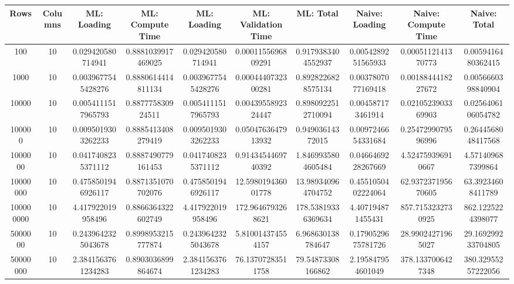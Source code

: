 \begin{table}[htb]
    \centering
    \begin{tabular}{@{}cccccccccc@{}}
        \toprule
        Rows & Columns & ML: Loading & ML: Compute Time & ML: Loading & ML: Validation Time & ML: Total & Naive: Loading & Naive: Compute Time & Naive: Total \\
        \midrule
        100 & 10 & 0.029420580714941 & 0.8881039917469025 & 0.029420580714941 & 0.0001155696809291 & 0.9179383404552937 & 0.0054289251565933 & 0.0005112141370773 & 0.0059416480362415 \\
        1000 & 10 & 0.0039677545428276 & 0.8880614414811134 & 0.0039677545428276 & 0.0004440732300281 & 0.8928226828575134 & 0.0037807077169418 & 0.0018844418227672 & 0.0056660398840904 \\
        10000 & 10 & 0.0054111517965793 & 0.887775830924511 & 0.0054111517965793 & 0.0043955892324447 & 0.8980922512710094 & 0.004587173461914 & 0.0210523903369903 & 0.0256406106054782 \\
        100000 & 10 & 0.0095019303262233 & 0.8885413408279419 & 0.0095019303262233 & 0.0504763647913932 & 0.94903614372015 & 0.0097246654331684 & 0.2547299079596996 & 0.2644568048417568 \\
        1000000 & 10 & 0.0417408235371112 & 0.8887490779161453 & 0.0417408235371112 & 0.9143454469740392 & 1.8469935804605484 & 0.0466469228267669 & 4.524759396910667 & 4.571409687399864 \\
        10000000 & 10 & 0.4758501946926117 & 0.8871351070702076 & 0.4758501946926117 & 12.598019436001778 & 13.989340964704752 & 0.4551050402224064 & 62.937237195670605 & 63.39234608411789 \\
        100000000 & 10 & 4.417922019958496 & 0.8866364322602749 & 4.417922019958496 & 172.9646793268621 & 178.53819336369634 & 4.407194871455431 & 857.7153232730925 & 862.1225224398077 \\
        5000000 & 10 & 0.2439642325043678 & 0.8998953215777874 & 0.2439642325043678 & 5.810014374554157 & 6.968630138784647 & 0.1790529675781726 & 28.99024271965027 & 29.169299233704805 \\
        50000000 & 10 & 2.3841563761234283 & 0.8903036899864674 & 2.3841563761234283 & 76.13707283511758 & 79.54873308166862 & 2.195847954601049 & 378.1337006427348 & 380.32955257222056 \\
        \bottomrule
    \end{tabular}
\end{table}